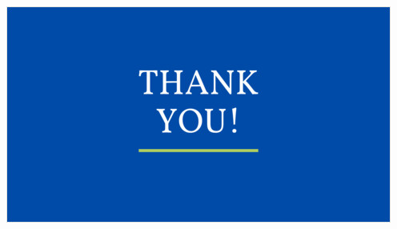\documentclass{SKP-beamer}
\begin{document}

\begin{frame}
		\begin{center}
			\includegraphics[scale=0.8]{ty.jpg}
		\end{center}
\end{frame}
\end{document}
